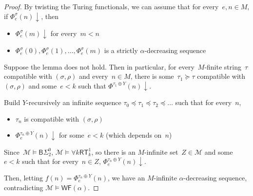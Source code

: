\documentclass[10pt,a4paper]{amsart}
\newcommand{\BSig}{\mathsf{B}\Sigma^0}
\newcommand{\M}{\mathcal{M}}
\newcommand{\RT}{\mathsf{RT}}
\newcommand{\WF}{\mathsf{WF}}
\begin{document}
\begin{proof}
By twisting the Turing functionals, we can assume that for every~$e, n \in M$, if $\Phi^\sigma_e(n)\downarrow$, then
\begin{itemize}
    \item $\Phi^\sigma_e(m)\downarrow$ for every~$m < n$
    \item $\Phi^\sigma_e(0), \Phi^\sigma_e(1), \dots, \Phi^\sigma_e(m)$ is a strictly $\alpha$-decreasing sequence
\end{itemize}

Suppose the lemma does not hold. Then in particular, for every~$M$-finite string~$\tau$ compatible with $(\sigma, \rho)$ and every~$n \in M$, there is some~$\tau_1 \succeq \tau$ compatible with~$(\sigma, \rho)$ and some~$e < k$ such that $\Phi^{\tau_1 \oplus Y}(n)\downarrow$.

Build $Y$-recursively an infinite sequence $\tau_0 \preceq \tau_1 \preceq \tau_2 \preceq \dots$ such that for every~$n$,
\begin{itemize}
    \item $\tau_n$ is compatible with $(\sigma, \rho)$
    \item $\Phi^{\tau_n \oplus Y}_e(n)\downarrow$ for some~$e < k$ (which depends on~$n$)
\end{itemize}
Since~$\M \models \BSig_2$, $\M \models \forall k\RT^1_k$,
so there is an $M$-infinite set~$Z \in \M$ and some~$e < k$ such that for every~$n \in Z$, $\Phi^{\tau_n \oplus Y}_e(n)\downarrow$.

Then, letting $f(n) = \Phi^{\tau_n \oplus Y}_e(n)$, we have an $M$-infinite $\alpha$-decreasing sequence, contradicting $\M \models \WF(\alpha)$.
\end{proof}
\end{document}
